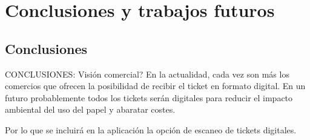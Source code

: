 \chapter{Conclusiones y trabajos futuros}

\section{Conclusiones}

CONCLUSIONES: Visión comercial?
En la actualidad, cada vez son más los comercios que ofrecen la posibilidad de recibir 
el ticket en formato digital. En un futuro probablemente todos los tickets serán 
digitales para reducir el impacto ambiental del uso del papel y abaratar costes.

Por lo que se incluirá en la aplicación la opción de escaneo de tickets digitales.
